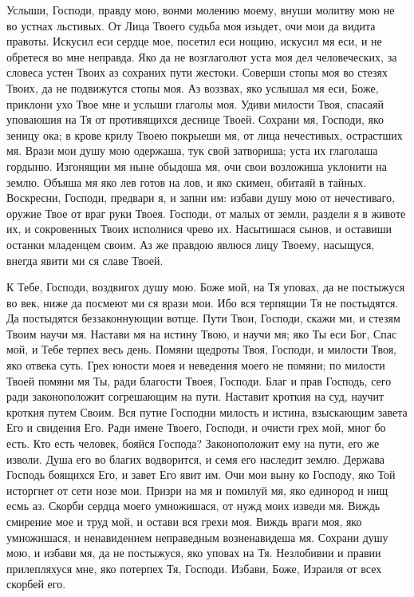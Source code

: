 \begin{mymulticols}
Услыши, Господи, правду мою, вонми молению моему, внуши молитву мою не во устнах льстивых. От Лица Твоего судьба моя изыдет, очи мои да видита правоты. Искусил еси сердце мое, посетил еси нощию, искусил мя еси, и не обретеся во мне неправда. Яко да не возглаголют уста моя дел человеческих, за словеса устен Твоих аз сохраних пути жестоки. Соверши стопы моя во стезях Твоих, да не подвижутся стопы моя. Аз воззвах, яко услышал мя еси, Боже, приклони ухо Твое мне и услыши глаголы моя. Удиви милости Твоя, спасаяй уповаюшия на Тя от противящихся деснице Твоей. Сохрани мя, Господи, яко зеницу ока; в крове крилу Твоею покрыеши мя, от лица нечестивых, острастших мя. Врази мои душу мою одержаша, тук свой затвориша; уста их глаголаша гордыню. Изгонящии мя ныне обыдоша мя, очи свои возложиша уклонити на землю. Объяша мя яко лев готов на лов, и яко скимен, обитаяй в тайных. Воскресни, Господи, предвари я, и запни им: избави душу мою от нечестиваго, оружие Твое от враг руки Твоея. Господи, от малых от земли, раздели я в животе их, и сокровенных Твоих исполнися чрево их. Насытишася сынов, и оставиши останки младенцем своим. Аз же правдою явлюся лицу Твоему, насыщуся, внегда явити ми ся славе Твоей.



К Тебе, Господи, воздвигох душу мою. Боже мой, на Тя уповах, да не постыжуся во век, ниже да посмеют ми ся врази мои. Ибо вся терпящии Тя не постыдятся. Да постыдятся беззаконнующии вотще. Пути Твои, Господи, скажи ми, и стезям Твоим научи мя. Настави мя на истину Твою, и научи мя; яко Ты еси Бог, Спас мой, и Тебе терпех весь день. Помяни щедроты Твоя, Господи, и милости Твоя, яко отвека суть. Грех юности моея и неведения моего не помяни; по милости Твоей помяни мя Ты, ради благости Твоея, Господи. Благ и прав Господь, сего ради законоположит согрешающим на пути. Наставит кроткия на суд, научит кроткия путем Своим. Вся путие Господни милость и истина, взыскающим завета Его и свидения Его. Ради имене Твоего, Господи, и очисти грех мой, мног бо есть. Кто есть человек, бояйся Господа? Законоположит ему на пути, его же изволи. Душа его во благих водворится, и семя его наследит землю. Держава Господь боящихся Его, и завет Его явит им. Очи мои выну ко Господу, яко Той исторгнет от сети нозе мои. Призри на мя и помилуй мя, яко единород и нищ есмь аз. Скорби сердца моего умножишася, от нужд моих изведи мя. Виждь смирение мое и труд мой, и остави вся грехи моя. Виждь враги моя, яко умножишася, и ненавидением неправедным возненавидеша мя. Сохрани душу мою, и избави мя, да не постыжуся, яко уповах на Тя. Незлобивии и правии прилепляхуся мне, яко потерпех Тя, Господи. Избави, Боже, Израиля от всех скорбей его.



\end{mymulticols}
